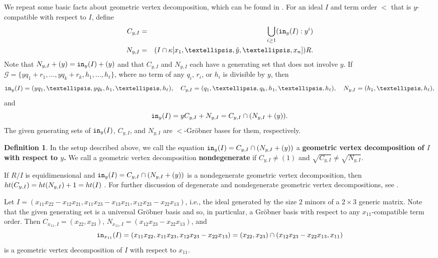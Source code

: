 \documentclass[12pt, reqno]{amsart}
\numberwithin{equation}{section}
\newtheorem{Main Conjecture}[theorem]{Main Conjecture}
\theoremstyle{definition}
\newtheorem{defn}[theorem]{Definition}
\newenvironment{example}
  {\pushQED{\qed}\renewcommand{\qedsymbol}{$\diamondsuit$}\examplex}
  {\popQED\endexamplex}
\theoremstyle{plain}
\newcommand{\init}{{\tt in}}
\newcommand{\hgt}{{\rm{ht }}}
\newcommand{\G}{\mathcal{G}}
\begin{document}
We repeat some basic facts about geometric vertex decomposition, which can be found in \cite[Section 2.1]{KMY09}.  For an ideal $I$ and term order $<$ that is $y$-compatible with respect to $I$, define 
\begin{eqnarray*}
    C_{y,I} &=& \bigcup_{i \geq 1} (\init_{y} (I): y^i) \\
    N_{y,I} &=& (I \cap \kappa[x_1, \ldots, \hat{y}, \ldots , x_n])R.
\end{eqnarray*}
 Note that $N_{y,I}+(y) = \init_{y}(I)+(y)$ and that $C_{y,I}$ and $N_{y,I}$ each have a generating set that does not involve $y$.  If $\G = \{yq_1+r_1, \dots, yq_k+r_k, h_1, \ldots, h_\ell\}$, where no term of any $q_i$, $r_i$, or $h_i$ is divisible by $y$, then \[
 \init_{y}(I) = (yq_1, \dots, yq_k, h_1, \ldots, h_\ell), \quad C_{y,I} = (q_1, \dots, q_k, h_1, \ldots, h_\ell), \quad N_{y,I} = (h_1, \ldots, h_\ell),
 \] and \[
\init_{y}(I) = yC_{y,I}+N_{y,I} = C_{y,I} \cap (N_{y,I}+(y)).
\] The given generating sets of $\init_{y}(I)$, $C_{y,I}$, and $N_{y,I}$ are $<$-Gr\"obner bases for them, respectively.
\begin{defn}
    In the setup described above, we call the equation $\init_{y}(I) = C_{y,I} \cap (N_{y,I}+(y))$ a \textbf{geometric vertex decomposition of $I$ with respect to $y$.}  We call a geometric vertex decomposition \textbf{nondegenerate} if $C_{y,I} \neq (1)$ and $\sqrt{C_{y,I}} \neq \sqrt{N_{y,I}}$.
\end{defn}

If $R/I$ is equidimensional and $\init_{y}(I) = C_{y,I} \cap (N_{y,I}+(y))$ is a nondegenerate geometric vertex decomposition, then $\hgt(C_{y,I}) = \hgt(N_{y,I})+1 = \hgt(I)$ \cite[Lemma 2.8]{KR21}. For further discussion of degenerate and nondegenerate geometric vertex decompositions, see \cite[Section 2]{KR21}.

\begin{example}\label{ex:gvd}
    Let $I = (x_{11}x_{22}-x_{12}x_{21}, x_{11}x_{23}-x_{13}x_{21}, x_{12}x_{23}-x_{22}x_{13})$, i.e., the ideal generated by the size $2$ minors of a $2 \times 3$ generic matrix. Note that the given generating set is a universal Gr\"obner basis and so, in particular, a Gr\"obner basis with respect to any $x_{11}$-compatible term order. Then $C_{x_{11},I} = (x_{22},x_{23})$, $N_{x_{11},I} = (x_{12}x_{23}-x_{22}x_{13})$, and \[
\init_{x_{11}}(I) = (x_{11}x_{22}, x_{11}x_{23}, x_{12}x_{23}-x_{22}x_{13}) = (x_{22},x_{23}) \cap (x_{12}x_{23}-x_{22}x_{13}, x_{11})
    \] is a geometric vertex decomposition of $I$ with respect to $x_{11}$.
\end{example}
\end{document}
